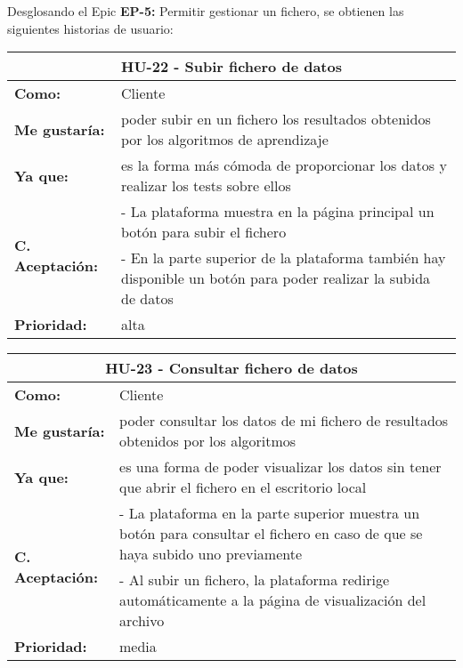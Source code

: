 
\newpage
Desglosando el Epic \textbf{EP-5:} Permitir gestionar un fichero, se obtienen las siguientes historias de usuario:

\begin{table}[H]
	\begin{tabular}{| p{3cm}| p{11cm} |}
		\hline
		\multicolumn{2}{|c|}{\textbf{HU-22} - Subir fichero de datos} \\ \hline
		\textbf{Como:} & Cliente \\ \hline
		\textbf{Me gustaría:} & poder subir en un fichero los resultados obtenidos por los algoritmos de aprendizaje \\ \hline
		\textbf{Ya que:} & es la forma más cómoda de proporcionar los datos y realizar los tests sobre ellos \\ \hline
		\multirow{2}{11cm}{\textbf{C. Aceptación:}} & - La plataforma muestra en la página principal un botón para subir el fichero \\
		& - En la parte superior de la plataforma también hay disponible un botón para poder realizar la subida de datos \\ \hline
		\textbf{\textbf{Prioridad:}} & alta \\ \hline
	\end{tabular}
\end{table}


\begin{table}[H]
	\begin{tabular}{| p{3cm}| p{11cm} |}
		\hline
		\multicolumn{2}{|c|}{\textbf{HU-23} - Consultar fichero de datos} \\ \hline
		\textbf{Como:} & Cliente \\ \hline
		\textbf{Me gustaría:} & poder consultar los datos de mi fichero de resultados obtenidos por los algoritmos \\ \hline
		\textbf{Ya que:} & es una forma de poder visualizar los datos sin tener que abrir el fichero en el escritorio local \\ \hline
		\multirow{2}{11cm}{\textbf{C. Aceptación:}} & - La plataforma en la parte superior muestra un botón para consultar el fichero en caso de que se haya subido uno previamente \\
		& - Al subir un fichero, la plataforma redirige automáticamente a la página de visualización del archivo \\ \hline
		\textbf{\textbf{Prioridad:}} & media \\ \hline
	\end{tabular}
\end{table}


